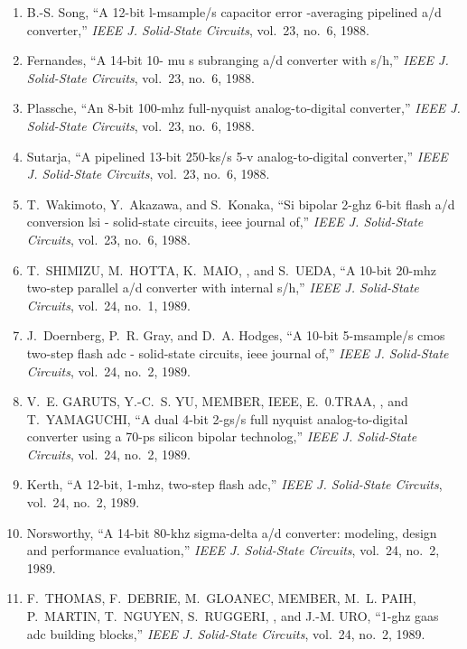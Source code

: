 \begin{enumerate}
\item
B.-S. Song, ``A 12-bit l-msample/s capacitor error -averaging pipelined a/d
  converter,'' \emph{{IEEE} J. Solid-State Circuits}, vol.~23, no.~6, 1988.

\item
Fernandes, ``A 14-bit 10- mu s subranging a/d converter with s/h,''
  \emph{{IEEE} J. Solid-State Circuits}, vol.~23, no.~6, 1988.

\item
Plassche, ``An 8-bit 100-mhz full-nyquist analog-to-digital converter,''
  \emph{{IEEE} J. Solid-State Circuits}, vol.~23, no.~6, 1988.

\item
Sutarja, ``A pipelined 13-bit 250-ks/s 5-v analog-to-digital converter,''
  \emph{{IEEE} J. Solid-State Circuits}, vol.~23, no.~6, 1988.

\item
T.~Wakimoto, Y.~Akazawa, and S.~Konaka, ``Si bipolar 2-ghz 6-bit flash a/d
  conversion lsi - solid-state circuits, ieee journal of,'' \emph{{IEEE} J.
  Solid-State Circuits}, vol.~23, no.~6, 1988.

\item
T.~SHIMIZU, M.~HOTTA, K.~MAIO, , and S.~UEDA, ``A 10-bit 20-mhz two-step
  parallel a/d converter with internal s/h,'' \emph{{IEEE} J. Solid-State
  Circuits}, vol.~24, no.~1, 1989.

\item
J.~Doernberg, P.~R. Gray, and D.~A. Hodges, ``A 10-bit 5-msample/s cmos
  two-step flash adc - solid-state circuits, ieee journal of,'' \emph{{IEEE} J.
  Solid-State Circuits}, vol.~24, no.~2, 1989.

\item
V.~E. GARUTS, Y.-C.~S. YU, MEMBER, IEEE, E.~0.TRAA, , and T.~YAMAGUCHI, ``A
  dual 4-bit 2-gs/s full nyquist analog-to-digital converter using a 70-ps
  silicon bipolar technolog,'' \emph{{IEEE} J. Solid-State Circuits}, vol.~24,
  no.~2, 1989.

\item
Kerth, ``A 12-bit, 1-mhz, two-step flash adc,'' \emph{{IEEE} J. Solid-State
  Circuits}, vol.~24, no.~2, 1989.

\item
Norsworthy, ``A 14-bit 80-khz sigma-delta a/d converter: modeling, design and
  performance evaluation,'' \emph{{IEEE} J. Solid-State Circuits}, vol.~24,
  no.~2, 1989.

\item
F.~THOMAS, F.~DEBRIE, M.~GLOANEC, MEMBER, M.~L. PAIH, P.~MARTIN, T.~NGUYEN,
  S.~RUGGERI, , and J.-M. URO, ``1-ghz gaas adc building blocks,'' \emph{{IEEE}
  J. Solid-State Circuits}, vol.~24, no.~2, 1989.


\end{enumerate}
